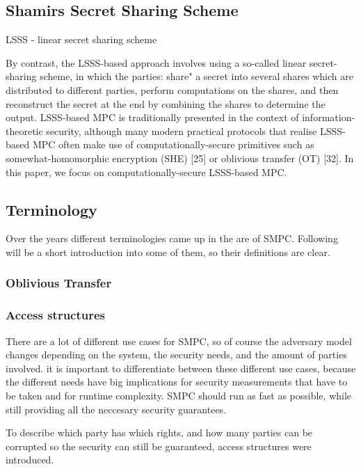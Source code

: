 \documentclass[english,runningheads,a4paper]{llncs}[2018/03/10]
\begin{document}
 
\subsection{Shamirs Secret Sharing Scheme}

LSSS - linear secret sharing scheme

By contrast, the LSSS-based approach involves using a so-called linear
secret-sharing scheme, in which the parties: share" a secret into several shares
which are distributed to different parties, perform computations on the shares,
and then reconstruct the secret at the end by combining the shares to determine
the output. LSSS-based MPC is traditionally presented in the context of
information-theoretic security, although many modern practical protocols that
realise LSSS-based MPC often make use of computationally-secure primitives
such as somewhat-homomorphic encryption (SHE) [25] or oblivious transfer
(OT) [32]. In this paper, we focus on computationally-secure LSSS-based MPC.


\subsection{Terminology}
Over the years different terminologies came up in the are of SMPC. Following will be a short introduction into some of them, so their definitions are clear.

\subsubsection{Oblivious Transfer}

\subsubsection{Access structures}
There are a lot of different use cases for SMPC, so of course the adversary model changes depending on the system, the security needs, and the amount of parties involved. it is important to differentiate between these different use cases, because the different needs have big implications for security measurements that have to be taken and for runtime complexity. SMPC should run as fast as possible, while still providing all the neccesary security guarantees.

To describe which party has which rights, and how many parties can be corrupted so the security can still be guaranteed, access structures were introduced.
\end{document}
